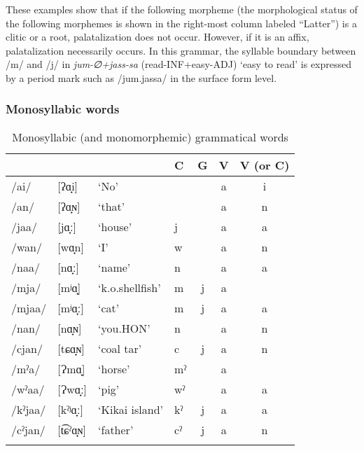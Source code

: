 These examples show that if the following morpheme (the morphological status of the following morphemes is shown in the right-most column labeled “Latter”) is a clitic or a root, palatalization does not occur. However, if it is an affix, palatalization necessarily occurs. In this grammar, the syllable boundary between /m/ and /j/ in \textit{jum-∅+jass-sa} (read-INF+easy-ADJ) ‘easy to read’ is expressed by a period mark such as /jum.jassa/ in the surface form level.

\subsubsection{Monosyllabic words}
\begin{table}[H]
\caption{Monosyllabic (and monomorphemic) grammatical words}
\begin{tabular}{l@{ }l@{ }llccc} 
\lsptoprule
                 & &   & C  & G &  V  &  V (or C)\\\midrule
/ai/ & [ʔɑ̟i] & ‘No’    &    &   &   a  & i\\
/an/ & [ʔɑ̟ɴ] & ‘that’  &    &   & a   & n\\
/jaa/ & [jɑ̟ː] & ‘house’  & j &  &  a &  a\\
/wan/ & [wɑ̟n] & ‘I’  & w  & &  a &  n\\
/naa/ & [nɑ̟ː] & ‘name’  & n  & &  a &  a\\
/mja/ & [mʲɑ̟] & ‘k.o.shellfish’  & m &  j &  a  \\
/mjaa/ & [mʲɑ̟ː] & ‘cat’ &  m &  j &  a &  a\\
/nan/ & [nɑ̟ɴ] & ‘you.HON’  & n  &  &  a &  n\\
/cjan/ & [tɕɑ̟ɴ] & ‘coal tar’  & c  & j  & a &  n\\
/mˀa/ & [Ɂmɑ̟] & ‘horse’  & mˀ  & &  a & \\
/wˀaa/ & [Ɂwɑ̟ː] & ‘pig’  & wˀ &  &  a &  a\\
/kˀjaa/ & [kˀʲɑ̟ː] & ‘Kikai island’ &  kˀ &  j &  a &  a\\
/cˀjan/ & [t͡ɕˀɑ̟ɴ] & ‘father’  & cˀ &  j &  a &  n\\
\lspbottomrule
\end{tabular}
\end{table}

